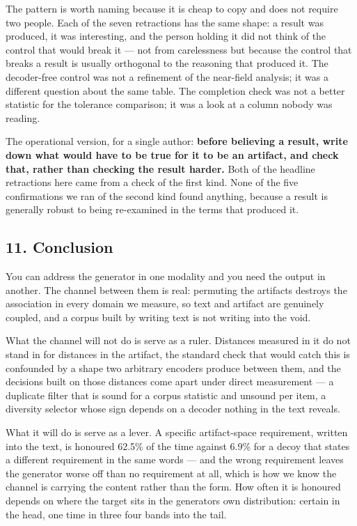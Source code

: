 \documentclass[
  10pt,
]{article}
\theoremstyle{plain}
\theoremstyle{definition}
\begin{document}
The pattern is worth naming because it is cheap to copy and does not
require two people. Each of the seven retractions has the same shape: a
result was produced, it was interesting, and the person holding it did
not think of the control that would break it --- not from carelessness
but because the control that breaks a result is usually orthogonal to
the reasoning that produced it. The decoder-free control was not a
refinement of the near-field analysis; it was a different question about
the same table. The completion check was not a better statistic for the
tolerance comparison; it was a look at a column nobody was reading.

The operational version, for a single author: \textbf{before believing a
result, write down what would have to be true for it to be an artifact,
and check that, rather than checking the result harder.} Both of the
headline retractions here came from a check of the first kind. None of
the five confirmations we ran of the second kind found anything, because
a result is generally robust to being re-examined in the terms that
produced it.

\subsection{11. Conclusion}\label{11-conclusion}

You can address the generator in one modality and you need the output in
another. The channel between them is real: permuting the artifacts
destroys the association in every domain we measure, so text and
artifact are genuinely coupled, and a corpus built by writing text is
not writing into the void.

What the channel will not do is serve as a ruler. Distances measured in
it do not stand in for distances in the artifact, the standard check
that would catch this is confounded by a shape two arbitrary encoders
produce between them, and the decisions built on those distances come
apart under direct measurement --- a duplicate filter that is sound for
a corpus statistic and unsound per item, a diversity selector whose sign
depends on a decoder nothing in the text reveals.

What it will do is serve as a lever. A specific artifact-space
requirement, written into the text, is honoured 62.5\% of the time
against 6.9\% for a decoy that states a different requirement in the
same words --- and the wrong requirement leaves the generator worse off
than no requirement at all, which is how we know the channel is carrying
the content rather than the form. How often it is honoured depends on
where the target sits in the generator\textquotesingle s own
distribution: certain in the head, one time in three four bands into the
tail.
\end{document}

